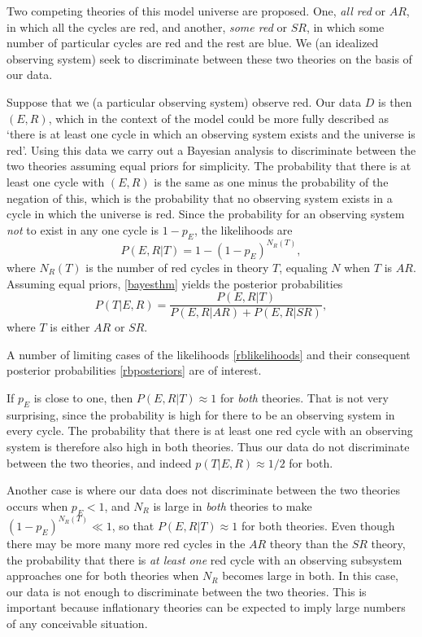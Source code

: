 \documentclass[pra,floatfix,preprint,nofootinbib,12pt]{revtex4}
\begin{document}
Two competing theories of this model universe are proposed. One, {\it all red\/} or $AR$, 
in which all the cycles are red, and another, {\it some red\/} or $SR$, in which some number of particular cycles are red and the rest are blue. We (an idealized observing system) seek to discriminate between these two theories on the basis of our data. 

Suppose that we (a particular observing system) observe red. Our data $D$ is then $(E,R)$, 
which in the context of the model could be more fully described as `there is at least one cycle in which an observing system exists and the universe is red'.   Using this data we carry out a Bayesian analysis to discriminate between the two theories assuming equal priors for simplicity. The probability that there is at least one cycle with $(E,R)$ is the same as one minus the 
probability of the negation of this, which is 
the probability that no observing system exists in a cycle in which the universe is red. Since the probability for an observing system {\it not\/} to exist in any one cycle is $1-p_E$, the likelihoods are
\begin{equation}
P(E,R|T) = 1 - (1-p_{E})^{N_R(T)}  ,
\label{rblikelihoods}
\end{equation}
where $N_R(T)$ is the number of red cycles in theory $T$, equaling $N$ when $T$ is  $AR$. Assuming equal priors, \eqref{bayesthm} yields the posterior probabilities 
\begin{equation}
P(T|E,R) = \frac{P(E,R|T)}{P(E,R|AR) + P(E,R|SR)},
\label{rbposteriors}
\end{equation}
where $T$ is either $AR$ or $SR$. 

A number of limiting cases of the likelihoods \eqref{rblikelihoods} and their consequent posterior probabilities \eqref{rbposteriors} are of interest.   

If $p_E$ is close to one, then 
$P(E,R|T) \approx 1$ for {\it both\/} theories. That is not very surprising, since the probability is high for there to be an observing system in every cycle. The probability that there is at least one red cycle with an observing system is therefore also high in both theories. Thus our data do not discriminate between the two theories, and indeed  $p(T|E,R) \approx 1/2$ for both. 

Another case is where our data does not discriminate between the two theories occurs when 
$p_E <1$, and $N_R$ is large in {\it both} theories to make $(1-p_E)^{N_R(T)}\ll 1$, so that
$P(E,R|T)\approx 1$ for both theories. 
Even though there may be  more many more red cycles in the $AR$ theory than the $SR$ theory, the probability that there is {\it at least one} red cycle with an observing subsystem approaches one for both theories when $N_R$ becomes large in both. In this case, our data is not enough to discriminate between the two theories. 
This is important because inflationary theories can be expected to imply large numbers of any conceivable situation. 
\end{document}
